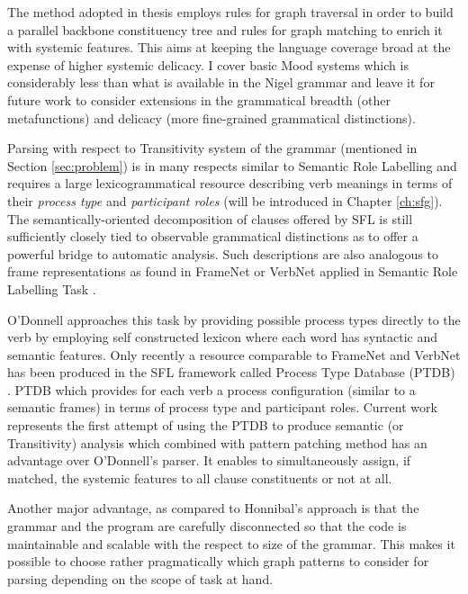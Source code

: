 The method adopted in thesis employs rules for graph traversal in order to build a parallel backbone constituency tree and rules for graph matching to enrich it with systemic features. This aims at keeping the language coverage broad at the expense of higher systemic delicacy. I cover basic Mood systems which is considerably less than what is available in the Nigel grammar and leave it for future work to consider extensions in the grammatical breadth (other metafunctions) and delicacy (more fine-grained grammatical distinctions).

Parsing with respect to Transitivity system of the grammar (mentioned in Section \ref{sec:problem}) is in many respects similar to Semantic Role Labelling and requires a large lexicogrammatical resource describing verb meanings in terms of their \textit{process type} and \textit{participant roles} (will be introduced in Chapter \ref{ch:sfg}). The semantically-oriented decomposition of clauses offered by SFL is still sufficiently closely tied to observable grammatical distinctions as to offer a powerful bridge to automatic analysis. Such descriptions are also analogous to frame representations \citep{Fillmore1985} as found in FrameNet \citep{Baker1998} or VerbNet \citep{Kipper2008} applied in Semantic Role Labelling Task \citep{Carreras2005}.

O'Donnell approaches this task by providing possible process types directly to the verb by employing self constructed lexicon where each word has syntactic and semantic features. Only recently a resource comparable to FrameNet and VerbNet has been produced in the SFL framework called Process Type Database (PTDB) \citep{Neale2002}. PTDB which provides for each verb a process configuration (similar to a semantic frames) in terms of process type and participant roles. Current work represents the first attempt of using the PTDB to produce semantic (or Transitivity) analysis which combined with pattern patching method has an advantage over O'Donnell's parser. It enables to simultaneously assign, if matched, the systemic features to all clause constituents or not at all.

Another major advantage, as compared to Honnibal's approach is that the grammar and the program are carefully disconnected so that the code is maintainable and scalable with the respect to size of the grammar. This makes it possible to choose rather pragmatically which graph patterns to consider for parsing depending on the scope of task at hand.

